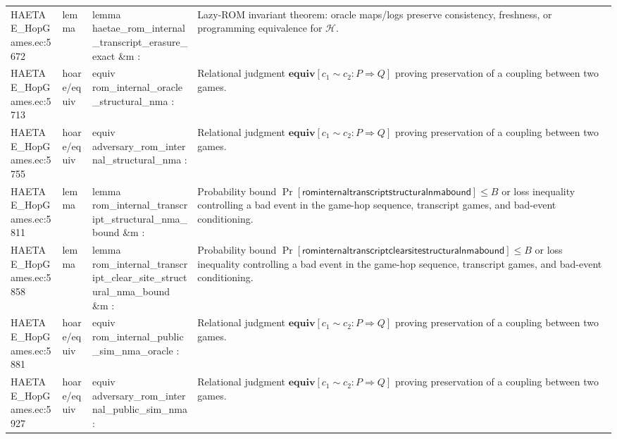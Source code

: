 \documentclass[10pt]{article}
\begin{document}
\begin{longtable}{L{0.11\textwidth}L{0.055\textwidth}L{0.385\textwidth}L{0.41\textwidth}}
HAETAE\_\allowbreak{}HopGames.\allowbreak{}ec:\allowbreak{}5672 & lemma & {\ttfamily\scriptsize lemma haetae\_\allowbreak{}rom\_\allowbreak{}internal\_\allowbreak{}transcript\_\allowbreak{}erasure\_\allowbreak{}exact \&m :} & Lazy-ROM invariant theorem: oracle maps/logs preserve consistency, freshness, or programming equivalence for $\mathcal H$. \\
HAETAE\_\allowbreak{}HopGames.\allowbreak{}ec:\allowbreak{}5713 & hoare/equiv & {\ttfamily\scriptsize equiv rom\_\allowbreak{}internal\_\allowbreak{}oracle\_\allowbreak{}structural\_\allowbreak{}nma :} & Relational judgment $\mathbf{equiv}[c_1\sim c_2:P\Rightarrow Q]$ proving preservation of a coupling between two games. \\
HAETAE\_\allowbreak{}HopGames.\allowbreak{}ec:\allowbreak{}5755 & hoare/equiv & {\ttfamily\scriptsize equiv adversary\_\allowbreak{}rom\_\allowbreak{}internal\_\allowbreak{}structural\_\allowbreak{}nma :} & Relational judgment $\mathbf{equiv}[c_1\sim c_2:P\Rightarrow Q]$ proving preservation of a coupling between two games. \\
HAETAE\_\allowbreak{}HopGames.\allowbreak{}ec:\allowbreak{}5811 & lemma & {\ttfamily\scriptsize lemma rom\_\allowbreak{}internal\_\allowbreak{}transcript\_\allowbreak{}structural\_\allowbreak{}nma\_\allowbreak{}bound \&m :} & Probability bound $\Pr[\mathsf{rominternaltranscriptstructuralnmabound}]\le B$ or loss inequality controlling a bad event in the game-hop sequence, transcript games, and bad-event conditioning. \\
HAETAE\_\allowbreak{}HopGames.\allowbreak{}ec:\allowbreak{}5858 & lemma & {\ttfamily\scriptsize lemma rom\_\allowbreak{}internal\_\allowbreak{}transcript\_\allowbreak{}clear\_\allowbreak{}site\_\allowbreak{}structural\_\allowbreak{}nma\_\allowbreak{}bound \&m :} & Probability bound $\Pr[\mathsf{rominternaltranscriptclearsitestructuralnmabound}]\le B$ or loss inequality controlling a bad event in the game-hop sequence, transcript games, and bad-event conditioning. \\
HAETAE\_\allowbreak{}HopGames.\allowbreak{}ec:\allowbreak{}5881 & hoare/equiv & {\ttfamily\scriptsize equiv rom\_\allowbreak{}internal\_\allowbreak{}public\_\allowbreak{}sim\_\allowbreak{}nma\_\allowbreak{}oracle :} & Relational judgment $\mathbf{equiv}[c_1\sim c_2:P\Rightarrow Q]$ proving preservation of a coupling between two games. \\
HAETAE\_\allowbreak{}HopGames.\allowbreak{}ec:\allowbreak{}5927 & hoare/equiv & {\ttfamily\scriptsize equiv adversary\_\allowbreak{}rom\_\allowbreak{}internal\_\allowbreak{}public\_\allowbreak{}sim\_\allowbreak{}nma :} & Relational judgment $\mathbf{equiv}[c_1\sim c_2:P\Rightarrow Q]$ proving preservation of a coupling between two games. \\

\end{longtable}
\end{document}
